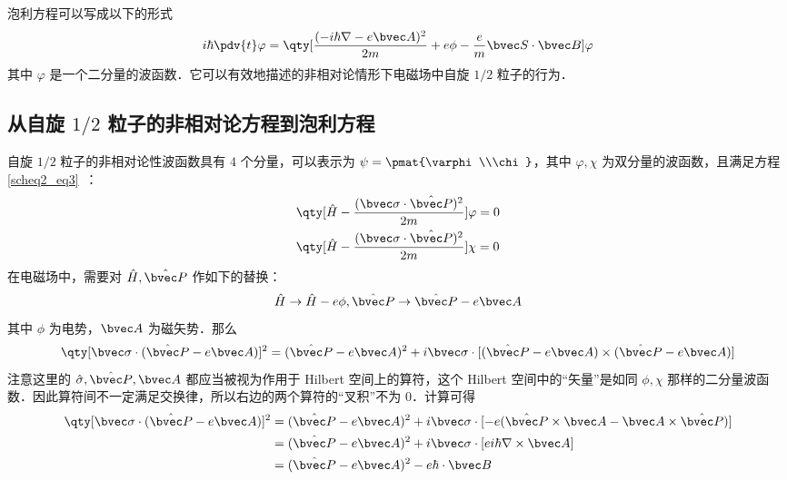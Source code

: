 
泡利方程可以写成以下的形式
\begin{equation}
i\hbar\pdv{t} \varphi = \qty[\frac{(-i\hbar\nabla - e\bvec A)^2}{2m}+e\phi-\frac{e}{m}\bvec S\cdot \bvec B]\varphi
\end{equation}
其中 $\varphi$ 是一个二分量的波函数．它可以有效地描述的非相对论情形下电磁场中自旋 $1/2$ 粒子的行为．
\subsection{从自旋 $1/2$ 粒子的非相对论方程到泡利方程}
自旋 $1/2$ 粒子的非相对论性波函数具有 $4$ 个分量，可以表示为 $\psi=\pmat{\varphi\\\chi}$，其中 $\varphi,\chi$ 为双分量的波函数，且满足方程\autoref{scheq2_eq3}~：
\begin{equation}
\begin{aligned}
&\qty[\hat H-\frac{(\bvec \sigma\cdot \hat{\bvec P})^2}{2m}]\varphi=0\\
&
\qty[\hat H-\frac{(\bvec \sigma\cdot \hat{\bvec P})^2}{2m}]\chi=0
\end{aligned}
\end{equation}
在电磁场中，需要对 $\hat H,\hat{\bvec P}$ 作如下的替换：
\begin{equation}
\hat H\rightarrow \hat H-e\phi, \hat{\bvec P}\rightarrow \hat{\bvec P}-e\bvec A
\end{equation}
其中 $\phi$ 为电势，$\bvec A$ 为磁矢势．那么
\begin{equation}
\qty[\bvec \sigma\cdot(\hat{\bvec P}-e\bvec A)]^2=(\hat{\bvec P}-e\bvec A)^2+i\bvec \sigma\cdot[(\hat{\bvec P}-e\bvec A)\times (\hat{\bvec P}-e\bvec A)]
\end{equation}
注意这里的 $\hat \sigma,\hat{\bvec P},\bvec A$ 都应当被视为作用于 Hilbert 空间上的算符，这个 Hilbert 空间中的“矢量”是如同 $\phi,\chi$ 那样的二分量波函数．因此算符间不一定满足交换律，所以右边的两个算符的“叉积”不为 $0$．计算可得
\begin{equation}
\begin{aligned}
\qty[\bvec \sigma \cdot (\hat{\bvec P}-e\bvec A)]^2
&=(\hat{\bvec P}-e\bvec A)^2+i\bvec \sigma\cdot[-e(\hat{\bvec P}\times \bvec A- \bvec A\times \hat{\bvec P})]\\
&=(\hat{\bvec P}-e\bvec A)^2+i\bvec \sigma\cdot[ei\hbar \nabla \times  \bvec A]\\
&=(\hat{\bvec P}-e\bvec A)^2-e\hbar\cdot \bvec B
\end{aligned}
\end{equation}
